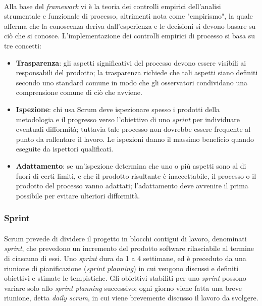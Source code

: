 \paragraph{}
Alla base del \textit{framework} vi è la teoria dei controlli empirici dell'analisi strumentale e funzionale di processo, altrimenti nota come "empirismo", la quale afferma che la conoscenza deriva dall'esperienza e le decisioni si devono basare su ciò che si conosce. L'implementazione dei controlli empirici di processo si basa su tre concetti:
\begin{itemize}
    \item \textbf{Trasparenza}: gli aspetti significativi del processo devono essere visibili ai responsabili del prodotto; la trasparenza richiede che tali aspetti siano definiti secondo uno standard comune in modo che gli osservatori condividano una comprensione comune di ciò che avviene.
    \item \textbf{Ispezione}: chi usa Scrum deve ispezionare spesso i prodotti della metodologia e il progresso verso l'obiettivo di uno \textit{sprint} per individuare eventuali difformità; tuttavia tale processo non dovrebbe essere frequente al punto da rallentare il lavoro. Le ispezioni danno il massimo beneficio quando eseguite da ispettori qualificati.
    \item \textbf{Adattamento}: se un'ispezione determina che uno o più aspetti sono al di fuori di certi limiti, e che il prodotto risultante è inaccettabile, il processo o il prodotto del processo vanno adattati; l'adattamento deve avvenire il prima possibile per evitare ulteriori difformità.
\end{itemize}

\subsubsection{Sprint}
\paragraph{}
Scrum prevede di dividere il progetto in blocchi contigui di lavoro, denominati \textit{sprint}, che prevedono un incremento del prodotto software rilasciabile al termine di ciascuno di essi.
Uno \textit{sprint} dura da 1 a 4 settimane, ed è preceduto da una riunione di pianificazione (\textit{sprint planning}) in cui vengono discussi e definiti obiettivi e stimate le tempistiche. Gli obiettivi stabiliti per uno \textit{sprint} possono variare solo allo \textit{sprint planning} successivo; ogni giorno viene fatta una breve riunione, detta \textit{daily scrum}, in cui viene brevemente discusso il lavoro da svolgere.

